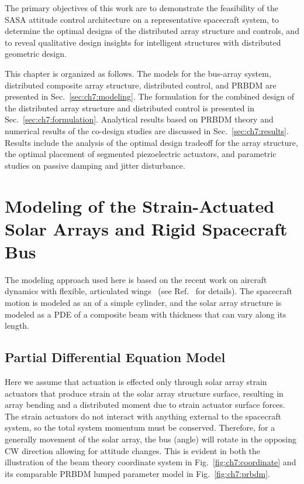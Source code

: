 The primary objectives of this work are to demonstrate the feasibility of the SASA attitude control architecture on a representative spacecraft system, to determine the optimal designs of the distributed array structure and controls, and to reveal qualitative design insights for intelligent structures with distributed geometric design. 

This chapter is organized as follows. The models for the bus-array system, distributed composite array structure, distributed control, and PRBDM are presented in Sec.~\ref{sec:ch7:modeling}. The formulation for the combined design of the distributed array structure and distributed control is presented in Sec.~\ref{sec:ch7:formulation}. Analytical results based on PRBDM theory and numerical results of the co-design studies are discussed in Sec.~\ref{sec:ch7:results}. Results include the analysis of the optimal design tradeoff for the array structure, the optimal placement of segmented piezoelectric actuators, and parametric studies on passive damping and jitter disturbance.

\section{Modeling of the Strain-Actuated Solar Arrays and Rigid Spacecraft Bus\label{sec:ch7:modeling}}

The modeling approach used here is based on the recent work on aircraft dynamics with flexible, articulated wings~\cite{Paranjape2012a} (see Ref.~\cite{Nakka2016a} for details).
The spacecraft motion is modeled as an  of a simple cylinder, and the solar array structure is modeled as a PDE of a composite beam with thickness that can vary along its length.



\subsection{Partial Differential Equation Model \label{sec:ch7:beam}}
Here we assume that actuation is effected only through solar array strain actuators that produce strain at the solar array structure surface, resulting in array bending and a distributed moment due to strain actuator surface forces. The strain actuators do not interact with anything external to the spacecraft system, so the total system momentum must be conserved. Therefore, for a generally   movement of the solar array, the bus (\gls{angle}) will rotate in the opposing CW direction allowing for attitude changes. This is evident in both the illustration of the beam theory coordinate system in Fig.~\ref{fig:ch7:coordinate} and its comparable PRBDM lumped parameter model in Fig.~\ref{fig:ch7:prbdm}.

